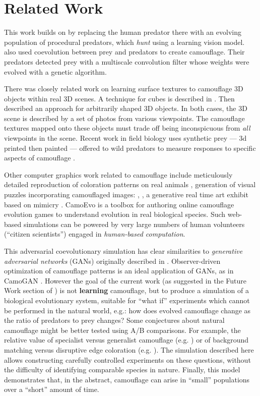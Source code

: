 \documentclass[letterpaper]{article}
\newcommand{\jargon}[1]{\textit{#1}}
\begin{document}
\section{Related Work}
This work builds on \citet{reynolds_iec_2011} by replacing the human predator there with an evolving population of procedural predators, which \jargon{hunt} using a learning vision model. \citet{harrington_coevolution_2014} also used coevolution between prey and predators to create camouflage. Their predators detected prey with a multiscale convolution filter whose weights were evolved with a genetic algorithm.
\par
There was closely related work on learning surface textures to camouflage 3D objects within real 3D scenes. A technique for cubes is described in \citet{owens_camouflaging_2014}. Then \citet{guo_ganmouflage_2022} described an approach for arbitrarily shaped 3D objects. In both cases, the 3D scene is described by a set of photos from various viewpoints. The camouflage textures mapped onto these objects must trade off being inconspicuous from \textit{all} viewpoints in the scene. Recent work in field biology uses synthetic prey --- 3d printed then painted --- offered to wild predators to measure responses to specific aspects of camouflage \citep{kelley_role_2023}.
\par
Other computer graphics work related to camouflage include meticulously detailed reproduction of coloration patterns on real animals \citep{de_gomensoro_malheiros_leopard_2020}, generation of visual puzzles incorporating camouflaged images: \citep{chu_camo_image_2010}, \citep{Zhang_Yin_Nie_Zheng_2020}, a generative real time art exhibit based on mimicry \citep{wu_mimicry_2021}. CamoEvo \citep{hancock_camoevo_2022} is a toolbox for authoring online camouflage evolution games to understand evolution in real biological species. Such web-based simulations can be powered by very large numbers of human volunteers (“citizen scientists”) engaged in \jargon{human-based computation}.
\par
This adversarial coevolutionary simulation has clear similarities to \jargon{generative adversarial networks} (GANs) originally described in \citet{goodfellow_gan_2014}. Observer-driven optimization of camouflage patterns is an ideal application of GANs, as in CamoGAN \citep{talas_camogan_2020}. However the goal of the current work (as suggested in the Future Work section of \citet{reynolds_iec_2011}) is not \textbf{learning} camouflage, but to produce a simulation of a biological evolutionary system, suitable for “what if” experiments which cannot be performed in the natural world, e.g.: how does evolved camouflage change as the ratio of predators to prey changes? Some conjectures about natural camouflage might be better tested using A/B comparisons. For example, the relative value of specialist versus generalist camouflage (e.g. \citet{hughes_imperfect_2019}) or of background matching versus disruptive edge coloration (e.g. \citet{price_background_2019}). The simulation described here allows constructing carefully controlled experiments on these questions, without the difficulty of identifying comparable species in nature. Finally, this model demonstrates that, in the abstract, camouflage can arise in “small” populations over a “short” amount of time.
\end{document}
